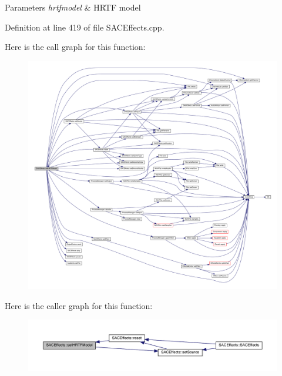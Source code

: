 \begin{DoxyParams}{Parameters}
{\em hrtfmodel} & H\+R\+TF model \\
\hline
\end{DoxyParams}


Definition at line 419 of file S\+A\+C\+Effects.\+cpp.

Here is the call graph for this function\+:
\nopagebreak
\begin{figure}[H]
\begin{center}
\leavevmode
\includegraphics[width=350pt]{class_s_a_c_effects_a9af83c6a63fcdf10e4bd849fa3c5973c_cgraph}
\end{center}
\end{figure}
Here is the caller graph for this function\+:
\nopagebreak
\begin{figure}[H]
\begin{center}
\leavevmode
\includegraphics[width=350pt]{class_s_a_c_effects_a9af83c6a63fcdf10e4bd849fa3c5973c_icgraph}
\end{center}
\end{figure}
\mbox{\label{class_s_a_c_effects_a5292df44aee2a4ec49c99e3136b5472e}} 
